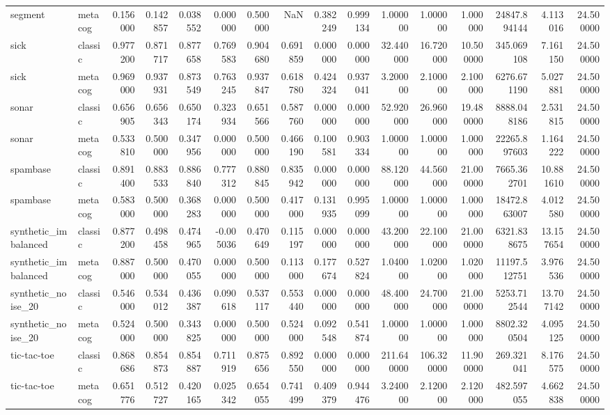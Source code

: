 \begin{tabular}{llrrrrrrrrrrrrrr}
segment & metacog & 0.156000 & 0.142857 & 0.038552 & 0.000000 & 0.500000 & NaN & 0.382249 & 0.999134 & 1.000000 & 1.000000 & 1.000000 & 24847.894144 & 4.113016 & 24.500000 \\
sick & classic & 0.977200 & 0.871717 & 0.877658 & 0.769583 & 0.904680 & 0.691859 & 0.000000 & 0.000000 & 32.440000 & 16.720000 & 10.500000 & 345.069108 & 7.161150 & 24.500000 \\
sick & metacog & 0.969000 & 0.937931 & 0.873549 & 0.763245 & 0.937847 & 0.618780 & 0.424324 & 0.937041 & 3.200000 & 2.100000 & 2.100000 & 6276.671190 & 5.027881 & 24.500000 \\
sonar & classic & 0.656905 & 0.656343 & 0.650174 & 0.323934 & 0.651566 & 0.587760 & 0.000000 & 0.000000 & 52.920000 & 26.960000 & 19.480000 & 8888.048186 & 2.531815 & 24.500000 \\
sonar & metacog & 0.533810 & 0.500000 & 0.347956 & 0.000000 & 0.500000 & 0.466190 & 0.100581 & 0.903334 & 1.000000 & 1.000000 & 1.000000 & 22265.897603 & 1.164222 & 24.500000 \\
spambase & classic & 0.891400 & 0.883533 & 0.886840 & 0.777312 & 0.880845 & 0.835942 & 0.000000 & 0.000000 & 88.120000 & 44.560000 & 21.000000 & 7665.362701 & 10.881610 & 24.500000 \\
spambase & metacog & 0.583000 & 0.500000 & 0.368283 & 0.000000 & 0.500000 & 0.417000 & 0.131935 & 0.995099 & 1.000000 & 1.000000 & 1.000000 & 18472.863007 & 4.012580 & 24.500000 \\
synthetic_imbalanced & classic & 0.877200 & 0.498458 & 0.474965 & -0.005036 & 0.470649 & 0.115197 & 0.000000 & 0.000000 & 43.200000 & 22.100000 & 21.000000 & 6321.838675 & 13.157654 & 24.500000 \\
synthetic_imbalanced & metacog & 0.887000 & 0.500000 & 0.470055 & 0.000000 & 0.500000 & 0.113000 & 0.177674 & 0.527824 & 1.040000 & 1.020000 & 1.020000 & 11197.512751 & 3.976536 & 24.500000 \\
synthetic_noise_20 & classic & 0.546000 & 0.534012 & 0.436387 & 0.090618 & 0.537117 & 0.553440 & 0.000000 & 0.000000 & 48.400000 & 24.700000 & 21.000000 & 5253.712544 & 13.707142 & 24.500000 \\
synthetic_noise_20 & metacog & 0.524000 & 0.500000 & 0.343825 & 0.000000 & 0.500000 & 0.524000 & 0.092548 & 0.541874 & 1.000000 & 1.000000 & 1.000000 & 8802.320504 & 4.095125 & 24.500000 \\
tic-tac-toe & classic & 0.868686 & 0.854873 & 0.854887 & 0.711919 & 0.875656 & 0.892550 & 0.000000 & 0.000000 & 211.640000 & 106.320000 & 11.900000 & 269.321041 & 8.176575 & 24.500000 \\
tic-tac-toe & metacog & 0.651776 & 0.512727 & 0.420165 & 0.025342 & 0.654055 & 0.741499 & 0.409379 & 0.944476 & 3.240000 & 2.120000 & 2.120000 & 482.597055 & 4.662838 & 24.500000 \\
\bottomrule
\end{tabular}
